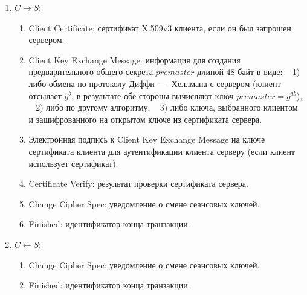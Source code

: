 \begin{enumerate}
    \item $C \rightarrow S$:
        \begin{enumerate}
            \item Client Certificate: сертификат X.509v3 клиента, если он был запрошен сервером.
            \item Client Key Exchange Message: информация для создания предварительного общего секрета $premaster$ длиной 48 байт в виде: ~ 1) либо обмена по протоколу Диффи~---~Хеллмана с сервером (клиент отсылает $g^b$, в результате обе стороны вычисляют ключ $premaster = g^{ab}$), ~ 2) либо по другому алгоритму, ~ 3) либо ключа, выбранного клиентом и зашифрованного на открытом ключе из сертификата сервера.
            \item Электронная подпись к Client Key Exchange Message на ключе сертификата клиента для аутентификации клиента серверу (если клиент использует сертификат).
            \item Certificate Verify: результат проверки сертификата сервера.
            \item Change Cipher Spec: уведомление о смене сеансовых ключей.
            \item Finished: идентификатор конца транзакции.
        \end{enumerate}

    \item $C \leftarrow S$:
        \begin{enumerate}
            \item Change Cipher Spec: уведомление о смене сеансовых ключей.
            \item Finished: идентификатор конца транзакции.
        \end{enumerate}
\end{enumerate}




